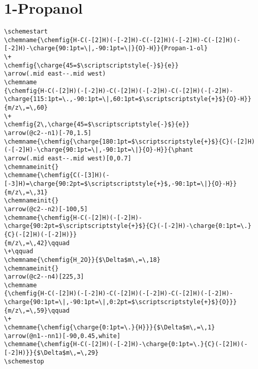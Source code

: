 \section{1-Propanol}\label{app:1-propanol}
\begin{footnotesize}
    \begin{lstlisting}
\schemestart
\chemname{\chemfig{H-C(-[2]H)(-[-2]H)-C(-[2]H)(-[-2]H)-C(-[2]H)(-[-2]H)-\charge{90:1pt=\|,-90:1pt=\|}{O}-H}}{Propan-1-ol}
\+
\chemfig{\charge{45=$\scriptscriptstyle{-}$}{e}}
\arrow(.mid east--.mid west)
\chemname
{\chemfig{H-C(-[2]H)(-[-2]H)-C(-[2]H)(-[-2]H)-C(-[2]H)(-[-2]H)-\charge{115:1pt=\.,-90:1pt=\|,60:1pt=$\scriptscriptstyle{+}$}{O}-H}}
{m/z\,=\,60}
\+
\chemfig{2\,\charge{45=$\scriptscriptstyle{-}$}{e}}
\arrow(@c2--n1)[-70,1.5]
\chemname{\chemfig{\charge{180:1pt=$\scriptscriptstyle{+}$}{C}(-[2]H)(-[-2]H)-\charge{90:1pt=\|,-90:1pt=\|}{O}-H}}{\phant
\arrow(.mid east--.mid west)[0,0.7]
\chemnameinit{}
\chemname{\chemfig{C(-[3]H)(-[-3]H)=\charge{90:2pt=$\scriptscriptstyle{+}$,-90:1pt=\|}{O}-H}}{m/z\,=\,31}
\chemnameinit{}
\arrow(@c2--n2)[-100,5]
\chemname{\chemfig{H-C(-[2]H)(-[-2]H)-\charge{90:2pt=$\scriptscriptstyle{+}$}{C}(-[-2]H)-\charge{0:1pt=\.}{C}(-[2]H)(-[-2]H)}}
{m/z\,=\,42}\qquad
\+\qquad
\chemname{\chemfig{H_2O}}{$\Delta$m\,=\,18}
\chemnameinit{}
\arrow(@c2--n4)[225,3]
\chemname
{\chemfig{H-C(-[2]H)(-[-2]H)-C(-[2]H)(-[-2]H)-C(-[2]H)(-[-2]H)-\charge{90:1pt=\|,-90:1pt=\|,0:2pt=$\scriptscriptstyle{+}$}{O}}}
{m/z\,=\,59}\qquad
\+
\chemname{\chemfig{\charge{0:1pt=\.}{H}}}{$\Delta$m\,=\,1}
\arrow(@n1--nn1)[-90,0.45,white]
\chemname{\chemfig{H-C(-[2]H)(-[-2]H)-\charge{0:1pt=\.}{C}(-[2]H)(-[-2]H)}}{$\Delta$m\,=\,29}
\schemestop
    \end{lstlisting}
\end{footnotesize}

\newpage


